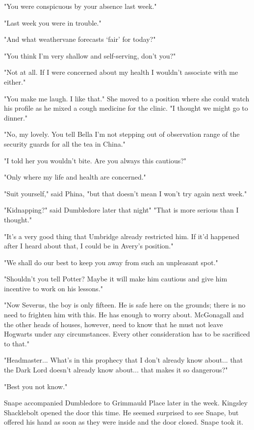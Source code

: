 "You were conspicuous by your absence last week."

"Last week you were in trouble."

"And what weathervane forecasts `fair' for today?"

"You think I'm very shallow and self-serving, don't you?"

"Not at all. If I were concerned about my health I wouldn't associate with me either."

"You make me laugh. I like that." She moved to a position where she could watch his profile as he mixed a cough medicine for the clinic. "I thought we might go to dinner."

"No, my lovely. You tell Bella I'm not stepping out of observation range of the security guards for all the tea in China."

"I told her you wouldn't bite. Are you always this cautious?"

"Only where my life and health are concerned."

"Suit yourself," said Phina, "but that doesn't mean I won't try again next week."

"Kidnapping?" said Dumbledore later that night" "That is more serious than I thought."

"It's a very good thing that Umbridge already restricted him. If it'd happened after I heard about that, I could be in Avery's position."

"We shall do our best to keep you away from such an unpleasant spot."

"Shouldn't you tell Potter? Maybe it will make him cautious and give him incentive to work on his lessons."

"Now Severus, the boy is only fifteen. He is safe here on the grounds; there is no need to frighten him with this. He has enough to worry about. McGonagall and the other heads of houses, however, need to know that he must not leave Hogwarts under any circumstances. Every other consideration has to be sacrificed to that."

"Headmaster... What's in this prophecy that I don't already know about... that the Dark Lord doesn't already know about... that makes it so dangerous?"

"Best you not know."

Snape accompanied Dumbledore to Grimmauld Place later in the week. Kingsley Shacklebolt opened the door this time. He seemed surprised to see Snape, but offered his hand as soon as they were inside and the door closed. Snape took it.

